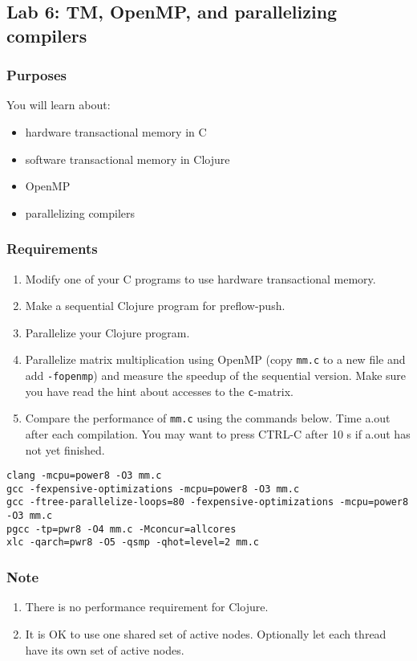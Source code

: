 \documentclass{forsete}
\begin{document}
\subsection*{Lab 6: TM, OpenMP, and parallelizing compilers}
\subsubsection*{Purposes}
You will learn about:
\begin{itemize}
\item hardware transactional memory in C
\item software transactional memory in Clojure
\item OpenMP
\item parallelizing compilers
\end{itemize}

\subsubsection*{Requirements}
\begin{enumerate}
\item Modify one of your C programs to use hardware transactional memory.
\item Make a sequential Clojure program for preflow-push.
\item Parallelize your Clojure program.
\item Parallelize matrix multiplication using OpenMP (copy \verb!mm.c! to a new file and add \verb.-fopenmp.) 
and measure the speedup of the sequential version.  Make sure you have read the hint about accesses to the \verb.c.-matrix.
\item Compare the performance of \verb!mm.c! using the commands below.
Time a.out after each compilation. You may want to press CTRL-C after 10 s if
a.out has not yet finished.
\end{enumerate}
\begin{verbatim} 
clang -mcpu=power8 -O3 mm.c
gcc -fexpensive-optimizations -mcpu=power8 -O3 mm.c
gcc -ftree-parallelize-loops=80 -fexpensive-optimizations -mcpu=power8 -O3 mm.c
pgcc -tp=pwr8 -O4 mm.c -Mconcur=allcores
xlc -qarch=pwr8 -O5 -qsmp -qhot=level=2 mm.c
\end{verbatim}

\subsubsection*{Note}
\begin{enumerate}
\item There is no performance requirement for Clojure.
\item It is OK to use one shared set of active nodes. Optionally let each thread have
its own set of active nodes.
\end{enumerate}
\end{document}
